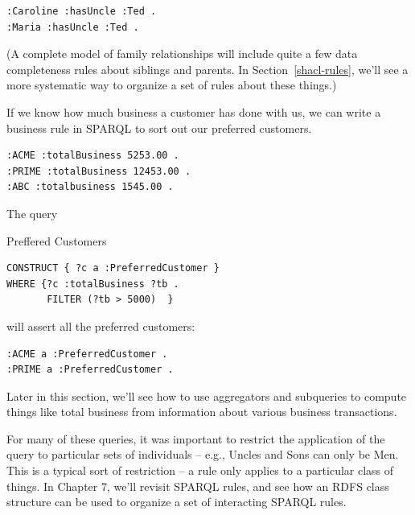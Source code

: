 \begin{lstlisting}
:Caroline :hasUncle :Ted .
:Maria :hasUncle :Ted .
\end{lstlisting}

(A complete model of family relationships will include quite a few data
completeness rules about siblings and parents. In Section~\ref{shacl-rules}, we'll see a
more systematic way to organize a set of rules about these things.)

If we know how much business a customer has done with us, we can write a
business rule in 
SPARQL to sort out our preferred customers.

\begin{lstlisting}
:ACME :totalBusiness 5253.00 .
:PRIME :totalBusiness 12453.00 .
:ABC :totalbusiness 1545.00 .
\end{lstlisting}

The query

\begin{query}Preffered Customers\end{query}
\begin{lstlisting}
CONSTRUCT { ?c a :PreferredCustomer }
WHERE {?c :totalBusiness ?tb .
       FILTER (?tb > 5000)  }
\end{lstlisting}

will assert all the preferred customers:

\begin{lstlisting}
:ACME a :PreferredCustomer .
:PRIME a :PreferredCustomer .
\end{lstlisting}

Later in this section, we'll see how to use aggregators and subqueries
to compute things like total business from information about various
business transactions.

For many of these queries, it was important to restrict the application
of the query to particular sets of individuals -- e.g., Uncles and Sons
can only be Men. This is a typical sort of restriction -- a rule only
applies to a particular class of things. In Chapter 7, we'll revisit
SPARQL rules, and see how an RDFS class structure can be used to
organize a set of interacting SPARQL rules.


